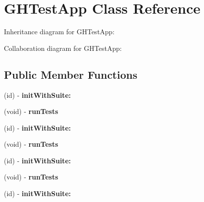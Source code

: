 \hypertarget{interface_g_h_test_app}{
\section{\-G\-H\-Test\-App \-Class \-Reference}
\label{interface_g_h_test_app}
}


\-Inheritance diagram for \-G\-H\-Test\-App\-:


\-Collaboration diagram for \-G\-H\-Test\-App\-:
\subsection*{\-Public \-Member \-Functions}
\begin{DoxyCompactItemize}
\item 
\hypertarget{interface_g_h_test_app_a7a02967b5f67c22338d416742d43b9b1}{
(id) -\/ {\bfseries init\-With\-Suite\-:}}
\label{interface_g_h_test_app_a7a02967b5f67c22338d416742d43b9b1}

\item 
\hypertarget{interface_g_h_test_app_aa4468189a6edda16bb85c6d3e4dda3a2}{
(void) -\/ {\bfseries run\-Tests}}
\label{interface_g_h_test_app_aa4468189a6edda16bb85c6d3e4dda3a2}

\item 
\hypertarget{interface_g_h_test_app_a7a02967b5f67c22338d416742d43b9b1}{
(id) -\/ {\bfseries init\-With\-Suite\-:}}
\label{interface_g_h_test_app_a7a02967b5f67c22338d416742d43b9b1}

\item 
\hypertarget{interface_g_h_test_app_aa4468189a6edda16bb85c6d3e4dda3a2}{
(void) -\/ {\bfseries run\-Tests}}
\label{interface_g_h_test_app_aa4468189a6edda16bb85c6d3e4dda3a2}

\item 
\hypertarget{interface_g_h_test_app_a7a02967b5f67c22338d416742d43b9b1}{
(id) -\/ {\bfseries init\-With\-Suite\-:}}
\label{interface_g_h_test_app_a7a02967b5f67c22338d416742d43b9b1}

\item 
\hypertarget{interface_g_h_test_app_aa4468189a6edda16bb85c6d3e4dda3a2}{
(void) -\/ {\bfseries run\-Tests}}
\label{interface_g_h_test_app_aa4468189a6edda16bb85c6d3e4dda3a2}

\item 
\hypertarget{interface_g_h_test_app_a7a02967b5f67c22338d416742d43b9b1}{
(id) -\/ {\bfseries init\-With\-Suite\-:}}
\label{interface_g_h_test_app_a7a02967b5f67c22338d416742d43b9b1}


\end{DoxyCompactItemize}

